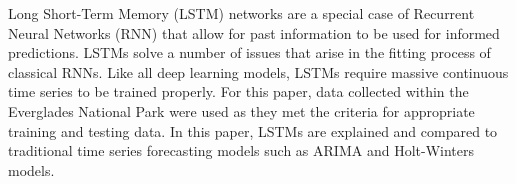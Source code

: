\begin{doublespace}
Long Short-Term Memory (LSTM) networks are a special case of Recurrent Neural Networks (RNN) that allow for past information to be used for informed predictions. LSTMs solve a number of issues that arise in the fitting process of classical RNNs. Like all deep learning models, LSTMs require massive continuous time series to be trained properly. For this paper, data collected within the Everglades National Park were used as they met the criteria for appropriate training and testing data. In this paper, LSTMs are explained and compared to traditional time series forecasting models such as ARIMA and Holt-Winters models.
\end{doublespace}